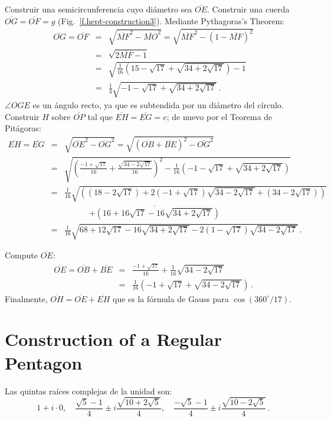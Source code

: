 Construir una semicircunferencia cuyo diámetro sea $\overline{OE}$. Construir una cuerda $\overline{OG}=\overline{OF}=g$ (Fig.~\ref{f.hept-construction3}). Mediante Pythagoras's Theorem:
\begin{eqnarray*}
\overline{OG}=\overline{OF}&=&\sqrt{\overline{MF}^2-\overline{MO}^2}=\sqrt{\overline{MF}^2-(1-\overline{MF})^2}\\
&=&\sqrt{2\overline{MF}-1}\\
&=&\sqrt{\frac{1}{16}\left(15-\sqrt{17}+\sqrt{34+2\sqrt{17}}\right)-1}\\
&=&\frac{1}{4}\sqrt{-1-\sqrt{17}+\sqrt{34+2\sqrt{17}}}\,.
\end{eqnarray*}
$\angle OGE$ es un ángulo recto, ya que es subtendida por un diámetro del círculo. Construir $H$ sobre $\overline{OP}$ tal que $\overline{EH}=\overline{EG}=e$; de nuevo por el Teorema de Pitágoras:
\begin{eqnarray*}
\overline{EH}=\overline{EG}&=&\sqrt{\overline{OE}^2-\overline{OG}^2}=\sqrt{(\overline{OB}+\overline{BE})^2-\overline{OG}^2}\\
&=&\sqrt{\left(\frac{-1+\sqrt{17}}{16}+\frac{\sqrt{34-2\sqrt{17}}}{16}\right)^2-
\frac{1}{16}\left(-1-\sqrt{17}+\sqrt{34+2\sqrt{17}}\right)}
\\
&=&\frac{1}{16}\sqrt{\left(
(18-2\sqrt{17})+ 2(-1+\sqrt{17})\sqrt{34-2\sqrt{17}}+
(34-2\sqrt{17})\right)}\\
&&\quad\quad\quad\overline{
+\left(16+16\sqrt{17}-16\sqrt{34+2\sqrt{17}}\right)}\\
&=&\frac{1}{16}\sqrt{
68+12\sqrt{17}-16\sqrt{34+2\sqrt{17}}-2(1-\sqrt{17})\sqrt{34-2\sqrt{17}}
}\,.
\end{eqnarray*}

Compute $\overline{OE}$:
\begin{eqnarray*}
\overline{OE}=\overline{OB}+\overline{BE}&=&\frac{-1+\sqrt{17}}{16}+\frac{1}{16}\sqrt{34-2\sqrt{17}}\\
&=&\frac{1}{16}\left(-1+\sqrt{17}+\sqrt{34-2\sqrt{17}}\right)\,.
\end{eqnarray*}
Finalmente, $\overline{OH}=\overline{OE}+\overline{EH}$ que es la fórmula de Gauss para $\cos (360^\circ/17)$.

\section{Construction of a Regular Pentagon}\label{s.hept-pentagon}

\begin{advanced}
Las quintas raíces complejas de la unidad son:
\[
1+i\cdot 0,\quad\frac{\sqrt{5}-1}{4}\pm i \frac{\sqrt{10+2\sqrt{5}}}{4},\quad\frac{-\sqrt{5}-1}{4}\pm i \frac{\sqrt{10-2\sqrt{5}}}{4}\,.
\]
\end{advanced}

